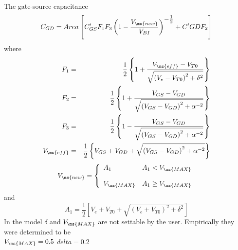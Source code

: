 The gate-source capacitance
\begin{equation}
C_{GD} = Area\left[C'_{GS}F_1F_3\left(1 - {{\textstyle
V_{\ms{new}}}
   \over{\textstyle V_{BI}}}\right)^{\textstyle - \frac{1}{2}}
   + C'{GD}F_2\right]
\end{equation}
where
\begin{eqnarray}
F_1 & = & {{\textstyle 1}\over{\textstyle 2}} \left\{ 1 +
    {{\textstyle V_{\ms{eff}}-V_{T0}}
    \over{\textstyle\sqrt{\left( V_e-V_{T0}\right)^2+\delta^2}}}\right\}\\
F_2 & = & {{\textstyle 1}\over{\textstyle 2}} \left\{ 1 +
    {{\textstyle V_{GS}-V_{GD}}
    \over{\textstyle\sqrt{\left( V_{GS}-V_{GD}\right)^2+\alpha^{-2}}}}\right\}\\
F_3 & = & {{\textstyle 1}\over{\textstyle 2}} \left\{ 1 -
    {{\textstyle V_{GS}-V_{GD}}
    \over{\textstyle\sqrt{\left( V_{GS}-V_{GD}\right)^2+\alpha^{-2}}}}\right\}\\
V_{\ms{eff}} & = & {{\textstyle 1}\over{\textstyle 2}}
\left\{V_{GS}+V_{GD}+
    \sqrt{\left( V_{GS}-V_{GD}\right)^2+\alpha^{-2}}\right\}\\
\end{eqnarray}
\begin{equation}
V_{\ms{new}} = \left\{ \begin{array}{ll}
    A_1 & A_1 < V_{\ms{MAX}} \\ \\
    V_{\ms{MAX}} & A_1 \ge V_{\ms{MAX}} \\
      \end{array} \right. %
\end{equation}
and
\begin{equation}
    A_1 = \frac{1}{2}\left[V_e + V_{T0}
          + \sqrt{(V_e+V_{T0})^2+\delta^2}\right]
\end{equation}
In the model $\delta$ and $V_{\ms{MAX}}$ are not settable by the
user.  Empirically they were determined to be\\[0.1in]
\hspace*{\fill} $V_{\ms{MAX}} = 0.5$ \hspace*{\fill} $delta = 0.2$
\hspace*{\fill}\\[0.1in]
